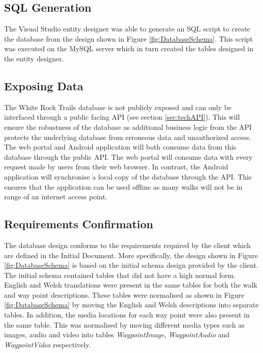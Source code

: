 \documentclass[11pt,a4paper]{article}
\begin{document}
\subsection{SQL Generation}

The Visual Studio entity designer was able to generate an SQL script to create the database from the design shown in Figure \ref{fig:DatabaseSchema}. This script was executed on the MySQL server which in turn created the tables designed in the entity designer.

\subsection{Exposing Data}

The White Rock Trails database is not publicly exposed and can only be interfaced through a public facing API (see section \ref{sec:techAPI}).
This will ensure the robustness of the database as additional business logic from the API protects the underlying database from erroneous data and unauthorized access.
The web portal and Android application will both consume data from this database through the public API.
The web portal will consume data with every request made by users from their web browser.
In contrast, the Android application will synchronise a local copy of the database through the API.
This ensures that the application can be used offline as many walks will not be in range of an internet access point.

\subsection{Requirements Confirmation}

The database design conforms to the requirements required by the client which are defined in the Initial Document.
More specifically, the design shown in Figure \ref{fig:DatabaseSchema} is based on the initial schema design provided by the client.
The initial schema contained tables that did not have a high normal form.
English and Welsh translations were present in the same tables for both the walk and way point descriptions.
These tables were normalised as shown in Figure \ref{fig:DatabaseSchema} by moving the English and Welsh descriptions into separate tables.
In addition, the media locations for each way point were also present in the same table.
This was normalised by moving different media types such as images, audio and video into tables \emph{WaypointImage}, \emph{WaypointAudio} and \emph{WaypointVideo} respectively.
\end{document}

